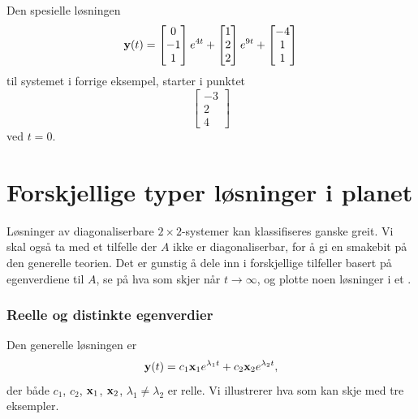 \begin{ex}
Den spesielle løsningen 
\[
\mathbf{y}(t)=
\begin{bmatrix}
0 \\ -1 \\ 1
\end{bmatrix} e^{4t}
+
\begin{bmatrix}
1 \\ 2 \\ 2
\end{bmatrix}e^{9t}
+
\begin{bmatrix}
-4 \\ 1 \\ 1
\end{bmatrix}
\]
til systemet i forrige eksempel, starter i punktet 
\[
\begin{bmatrix}
-3 \\ 2 \\ 4
\end{bmatrix}
\]
ved $t=0$. \qedhere
\end{ex}


\section*{Forskjellige typer løsninger i planet}

Løsninger av diagonaliserbare $2 \times 2$-systemer kan klassifiseres ganske greit. 
Vi skal også ta med et tilfelle der $A$ ikke er diagonaliserbar, for å gi en smakebit på den generelle teorien. 
Det er gunstig å dele inn i forskjellige tilfeller basert på egenverdiene til $A$, se på hva som skjer når $t \to \infty$, 
og plotte noen løsninger i et .

\subsubsection*{Reelle og distinkte egenverdier}
Den generelle løsningen er
\[
\mathbf{y}(t)=c_1\mathbf{x}_1e^{\lambda_1 t}+c_2\mathbf{x}_2e^{\lambda_2 t},
\]
der både $c_1$, $c_2$, $\mathbf{x}_1$, $\mathbf{x}_2$, $\lambda_1 \neq \lambda_2$ er relle. Vi illustrerer hva som kan skje med tre eksempler.


